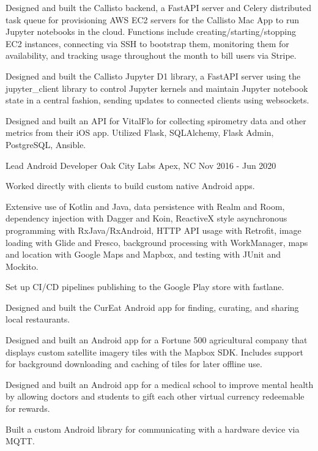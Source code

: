 \begin{cventries}
{\begin{cvitems}
        \item {Designed and built the Callisto backend, a FastAPI server and Celery distributed task queue for provisioning AWS EC2 servers for the Callisto Mac App to run Jupyter notebooks in the cloud. Functions include creating/starting/stopping EC2 instances, connecting via SSH to bootstrap them, monitoring them for availability, and tracking usage throughout the month to bill users via Stripe.}
        \item {Designed and built the Callisto Jupyter D1 library, a FastAPI server using the jupyter\_client library to control Jupyter kernels and maintain Jupyter notebook state in a central fashion, sending updates to connected clients using websockets.}
        \item {Designed and built an API for VitalFlo for collecting spirometry data and other metrics from their iOS app. Utilized Flask, SQLAlchemy, Flask Admin, PostgreSQL, Ansible.}
      \end{cvitems}
    }

  \cventry
    {Lead Android Developer} %
    {Oak City Labs} %
    {Apex, NC} %
    {Nov 2016 - Jun 2020} %
    {
      \begin{cvitems} %
        \item {Worked directly with clients to build custom native Android apps.}
        \item {Extensive use of Kotlin and Java, data persistence with Realm and Room, dependency injection with Dagger and Koin, ReactiveX style asynchronous programming with RxJava/RxAndroid, HTTP API usage with Retrofit, image loading with Glide and Fresco, background processing with WorkManager, maps and location with Google Maps and Mapbox, and testing with JUnit and Mockito.}
        \item {Set up CI/CD pipelines publishing to the Google Play store with fastlane.}
        \item {Designed and built the CurEat Android app for finding, curating, and sharing local restaurants.}
        \item {Designed and built an Android app for a Fortune 500 agricultural company that displays custom satellite imagery tiles with the Mapbox SDK. Includes support for background downloading and caching of tiles for later offline use.}
        \item {Designed and built an Android app for a medical school to improve mental health by allowing doctors and students to gift each other virtual currency redeemable for rewards.}
        \item {Built a custom Android library for communicating with a hardware device via MQTT.}
      \end{cvitems}
    }


\end{cventries}
